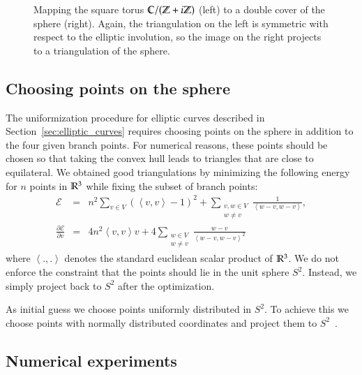\documentclass[Thesis]{subfiles}
\begin{document}
\begin{figure}
\centering
{}
\caption{ Mapping the square torus $\mathbb C/(\mathbb Z+i\mathbb Z)$ (left) to a double
  cover of the sphere (right). Again, the triangulation on the left
  is symmetric with respect to the elliptic involution, so the image
  on the right projects to a triangulation of the sphere.}
\label{fig:square_elliptic} 
\end{figure}


\subsection{Choosing points on the sphere}
\label{sec:spherical_triangulations}

The uniformization procedure for elliptic curves described in
Section~\ref{sec:elliptic_curves} requires choosing points on the
sphere in addition to the four given branch points. For numerical
reasons, these points should be chosen so that taking the convex hull
leads to triangles that are close to equilateral. We obtained good
triangulations by minimizing the following energy for $n$ points in
$\mathbb R^{3}$ while fixing the subset of branch points:
\begin{eqnarray}
\mathcal E &=& n^2\sum_{v\in V}\left( \left<v,v\right> - 1\right)^2 +
\sum_{\substack{v,w\in V\\w\neq v}} \frac{1}{\left<w-v,
    w-v\right>},
\\ 
\frac{\partial \mathcal E}{\partial v} &=& 4n^2\left<v,v\right>v + 4\sum_{\substack{w\in V\\w\neq v}}\frac{w-v}{\left<w-v,w-v\right>^2}
\end{eqnarray}
where $\left<.,.\right>$ denotes the standard euclidean scalar product
of $\mathbb R^{3}$. We do not enforce the constraint that the points should
lie in the unit sphere $S^{2}$. Instead, we simply project back to $S^{2}$
after the optimization.

As initial guess we choose points uniformly distributed in $S^{2}$. To
achieve this we choose points with normally distributed coordinates
and project them to $S^2$~\cite{Muller1959}.


\subsection{Numerical experiments}
\label{sec:numerical_convergence}
\end{document}
